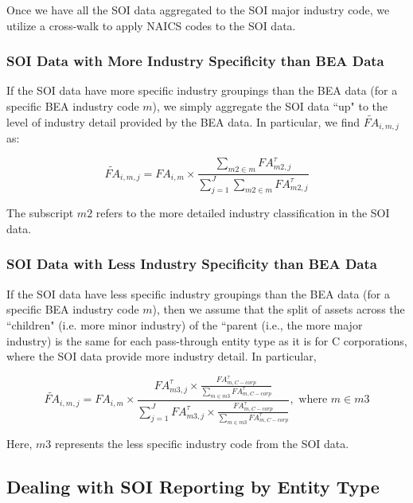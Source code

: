 \documentclass[article,11pt,letterpaper,fleqn]{article}
\theoremstyle{definition}
\numberwithin{equation}{section}
\begin{document}
Once we have all the SOI data aggregated to the SOI major industry code, we utilize a cross-walk to apply NAICS codes to the SOI data.

\subsubsection{SOI Data with More Industry Specificity than BEA Data}

If the SOI data have more specific industry groupings than the BEA data (for a specific BEA industry code $m$), we simply aggregate the SOI data ``up" to the level of industry detail provided by the BEA data.  In particular, we find $\widetilde{FA}_{i,m,j} $ as:

\begin{equation}
\widetilde{FA}_{i,m,j} = FA_{i,m}\times \frac{\sum_{m2\in m}FA^{\tau}_{m2,j}}{\sum_{j=1}^{J} \sum_{m2\in m} FA^{\tau}_{m2,j}}
\end{equation}

The subscript $m2$ refers to the more detailed industry classification in the SOI data.  

\subsubsection{SOI Data with Less Industry Specificity than BEA Data}

If the SOI data have less specific industry groupings than the BEA data (for a specific BEA industry code $m$), then we assume that the split of assets across the ``children" (i.e. more minor industry) of the ``parent (i.e., the more major industry) is the same for each pass-through entity type as it is for C corporations, where the SOI data provide more industry detail.  In particular,

\begin{equation}
\widetilde{FA}_{i,m,j} = FA_{i,m}\times \frac{FA^{\tau}_{m3,j}\times \frac{FA^{\tau}_{m,C-corp}}{\sum_{m\in m3}FA^{\tau}_{m,C-corp}}}{\sum_{j=1}^{J} FA^{\tau}_{m3,j}\times \frac{FA^{\tau}_{m,C-corp}}{\sum_{m\in m3}FA^{\tau}_{m,C-corp}}}, \text{ where } m\in m3
\end{equation}

Here, $m3$ represents the less specific industry code from the SOI data.

\subsection{Dealing with SOI Reporting by Entity Type}
\end{document}
